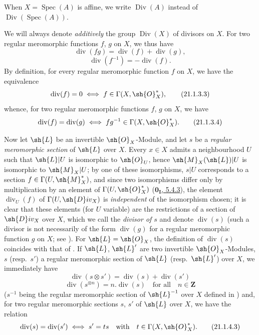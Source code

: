 When $X=\operatorname{Spec}(A)$ is affine, we write $\operatorname{Div}(A)$ instead of $\operatorname{Div}(\operatorname{Spec}(A))$.

\begin{env}[21.1.3]
\label{IV.21.1.3}
We will always denote \emph{additively} the group $\operatorname{Div}(X)$ of divisors on $X$.
For two regular meromorphic functions $f$, $g$ on $X$, we thus have
\[
\label{IV.21.1.3.1}
  \operatorname{div}(fg)=\operatorname{div}(f)+\operatorname{div}(g),
  \tag{21.1.3.1}
\]
\[
\label{IV.21.1.3.2}
  \operatorname{div}(f^{-1})=-\operatorname{div}(f).
  \tag{21.1.3.2}
\]
By definition, for every regular meromorphic function $f$ on $X$, we have the equivalence
\[
\label{IV.21.1.3.3}
  \operatorname{div}(f)=0 \iff f\in\Gamma(X,\sh{O}_X^*),
  \tag{21.1.3.3}
\]
whence, for two regular meromorphic functions $f$, $g$ on $X$, we have
\[
\label{IV.21.1.3.4}
  \operatorname{div}(f)=\operatorname{div}(g) \iff fg^{-1}\in\Gamma(X,\sh{O}_X^*).
  \tag{21.1.3.4}
\]
\end{env}

\begin{env}[21.1.4]
\label{IV.21.1.4}
Now let $\sh{L}$ be an invertible $\sh{O}_X$-Module, and let $s$ be a \emph{regular meromorphic section}  of $\sh{L}$ over $X$.
Every $x\in X$ admits a neighbourhood $U$ such that $\sh{L}|U$ is isomorphic to $\sh{O}_U$, hence $\sh{M}_X(\sh{L})|U$ is isomorphic to $\sh{M}_X|U$;
by one of these isomorphisms, $s|U$ corresponds to a section $f\in\Gamma(U,\sh{M}_X^*)$, and since two isomorphisms differ only by multiplication by an element of $\Gamma(U,\sh{O}_X^*)$ (\hyperref[0.5.4.3]{$\mathbf{0_I}$, 5.4.3}), the element $\operatorname{div}_U(f)$ of $\Gamma(U,\sh{D}iv_X)$ is \emph{independent} of the isomorphism chosen;
it is clear that these elements (for $U$ variable) are the restrictions of a section of $\sh{D}iv_X$ over $X$, which we call the \emph{divisor of $s$} and denote $\operatorname{div}(s)$ (such a divisor is not necessarily of the form $\operatorname{div}(g)$ for a regular meromorphic function $g$ on $X$;
see ).
For $\sh{L}=\sh{O}_X$, the definition of $\operatorname{div}(s)$ coincides with that of .
If $\sh{L}$, $\sh{L}'$ are two invertible $\sh{O}_X$-Modules, $s$ (resp.\ $s'$) a regular meromorphic section of $\sh{L}$ (resp.\ $\sh{L}'$) over $X$, we immediately have
\[
\label{IV.21.1.4.1}
  \operatorname{div}(s\otimes s')=\operatorname{div}(s)+\operatorname{div}(s')
  \tag{21.1.4.1}
\]
\[
\label{IV.21.1.4.2}
  \operatorname{div}(s^{\otimes n})=n.\operatorname{div}(s) \quad\text{for all}\quad n\in\mathbf{Z}
  \tag{21.1.4.2}
\]
($s^{-1}$ being the regular meromorphic section of $\sh{L}^{-1}$ over $X$ defined in )
and, for two regular meromorphic sections $s$, $s'$ of $\sh{L}$ over $X$, we have the relation
\[
\label{IV.21.1.4.3}
  \operatorname{div}(s)=\operatorname{div}(s') \iff s'=ts \quad\text{with}\quad t\in\Gamma(X,\sh{O}_X^*).
  \tag{21.1.4.3}
\]
\end{env}


